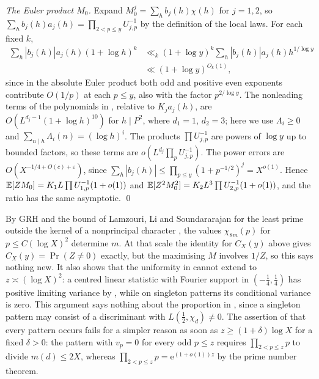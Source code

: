 \documentclass[11pt,colorlinks]{charlie}
\newcommand{\e}{\mathrm{e}}
\begin{document}
\emph{The Euler product $M_0$.} Expand $M_0^j=\sum_hb_j(h)\chi(h)$ for $j=1,2$, so $\sum_hb_j(h)a_j(h)=\prod_{2<p\le y}U_{j,p}^{-1}$ by the definition of the local laws. For each fixed $k$,
\begin{align*}
 \sum_h|b_j(h)|a_j(h)(1+\log h)^k&\ll_k(1+\log y)^k\sum_h|b_j(h)|a_j(h)h^{1/\log y}\\
 &\ll(1+\log y)^{O_k(1)},
\end{align*}
since in the absolute Euler product both odd and positive even exponents contribute $O(1/p)$ at each $p\le y$, also with the factor $p^{2/\log y}$. The nonleading terms of the polynomials in , relative to $K_ja_j(h)$, are $O(L^{d_j-1}(1+\log h)^{10})$ for $h\mid P^2$, where $d_1=1$, $d_2=3$; here we use $\Lambda_i\ge0$ and $\sum_{n\mid h}\Lambda_i(n)=(\log h)^i$. The products $\prod U_{j,p}^{-1}$ are powers of $\log y$ up to bounded factors, so these terms are $o(L^{d_j}\prod_pU_{j,p}^{-1})$. The power errors are $O(X^{-1/4+O(c)+\varepsilon})$, since $\sum_h|b_j(h)|\le\prod_{p\le y}(1+p^{-1/2})^j=X^{o(1)}$. Hence $\mathbb{E}[ZM_0]=K_1L\prod U_{1,p}^{-1}(1+o(1))$ and $\mathbb{E}[Z^2M_0^2]=K_2L^3\prod U_{2,p}^{-1}(1+o(1))$, and the ratio has the same asymptotic. \qed

\begin{remark}
By GRH \cite{Alpoge} and the bound of Lamzouri, Li and Soundararajan for the least prime outside the kernel of a nonprincipal character \cite{LLS}, the values $\chi_{8m}(p)$ for $p\le C(\log X)^2$ determine $m$. At that scale the identity for $C_X(y)$ above gives $C_X(y)=\Pr(Z\neq0)$ exactly, but the maximising $M$ involves $1/Z$, so this says nothing new. It also shows that the uniformity in  cannot extend to $z\asymp(\log X)^2$: a centred linear statistic with Fourier support in $(-\frac14,\frac14)$ has positive limiting variance by , while on singleton patterns its conditional variance is zero. This argument says nothing about the proportion in , since a singleton pattern may consist of a discriminant with $L(\frac12,\chi_d)\neq0$. The assertion of  that every pattern occurs fails for a simpler reason as soon as $z\ge(1+\delta)\log X$ for a fixed $\delta>0$: the pattern with $v_p=0$ for every odd $p\le z$ requires $\prod_{2<p\le z}p$ to divide $m(d)\le2X$, whereas $\prod_{2<p\le z}p=\e^{(1+o(1))z}$ by the prime number theorem.
\end{remark}

\appendix
\end{document}
